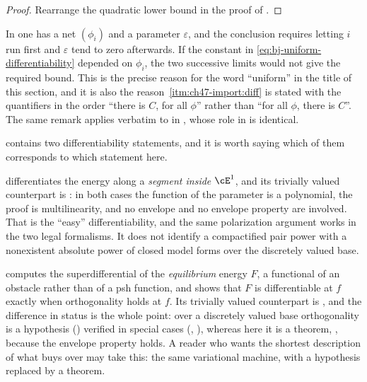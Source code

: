 \begin{proof}
Rearrange the quadratic lower bound in the proof of
.
\end{proof}

\begin{remark}
\label{rem:ch47-uniformity-indispensable}
In  one has a net $(\phi_i)$ and a
parameter $\varepsilon$, and the conclusion requires letting $i$ run
first and $\varepsilon$ tend to zero afterwards.  If the constant in
\eqref{eq:bj-uniform-differentiability} depended on $\phi_i$, the two
successive limits would not give the required bound.  This is the
precise reason for the word ``uniform'' in the title of this section, and
it is also the reason \,\cref{itm:ch47-import:diff}
is stated with the quantifiers in the order ``there is $C$, for all
$\phi$'' rather than ``for all $\phi$, there is $C$''.  The same
remark applies verbatim to  in
, whose role in
 is identical.
\end{remark}

\begin{remark}
\label{rem:ch47-compare-ch27}
 contains two differentiability
statements, and it is worth saying which of them corresponds to which
statement here.

 differentiates the energy along a
\emph{segment inside} $\cE^1$, and its trivially valued counterpart is
: in both cases the function of the
parameter is a polynomial, the proof is multilinearity, and no envelope and
no envelope property are involved.  That is the ``easy'' differentiability,
and the same polarization argument works in the two legal formalisms.  It
does not identify a compactified pair power with a nonexistent absolute
power of closed model forms over the discretely valued base.

 computes the superdifferential of the
\emph{equilibrium} energy $F$, a functional of an obstacle rather than of
a psh function, and shows that $F$ is differentiable at $f$ exactly
when orthogonality holds at $f$.  Its trivially valued counterpart is
, and the difference in status is the
whole point: over a discretely valued base orthogonality is a hypothesis
() verified in special cases
(,
), whereas here it is a theorem,
, because the envelope property
holds.  A reader who wants the shortest description of what
 buys over  may take this: the same variational
machine, with a hypothesis replaced by a theorem.
\end{remark}

